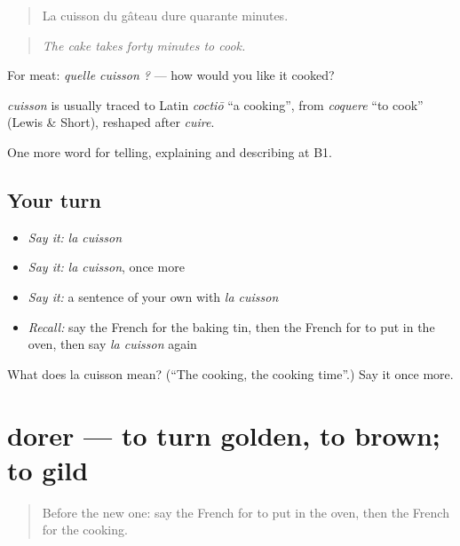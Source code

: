 \begin{quote}
La cuisson du gâteau dure quarante minutes.
\end{quote}

\begin{quote}
\emph{The cake takes forty minutes to cook.}
\end{quote}

For meat: \emph{quelle cuisson ?} — how would you like it cooked?

\begin{cousinweb}
\emph{cuisson} is usually traced to Latin \emph{coctiō} \textquotedblleft{}a cooking\textquotedblright{}, from \emph{coquere} \textquotedblleft{}to cook\textquotedblright{} (Lewis \& Short), reshaped after \emph{cuire}.
\end{cousinweb}

\begin{grammarlens}[title={What you've built}]
One more word for telling, explaining and describing at B1.
\end{grammarlens}

\subsection*{Your turn}
\begin{itemize}
\raggedright
  \item \emph{Say it:} \emph{la cuisson}
  \item \emph{Say it:} \emph{la cuisson}, once more
  \item \emph{Say it:} a sentence of your own with \emph{la cuisson}
  \item \emph{Recall:} say the French for the baking tin, then the French for to put in the oven, then say \emph{la cuisson} again
\end{itemize}

\begin{tcolorbox}[breakable,colback=teal!4,colframe=teal!35!black,title={Before you move on}]
What does la cuisson mean? (\textquotedblleft{}The cooking, the cooking time\textquotedblright{}.) Say it once more.
\end{tcolorbox}
\section[dorer]{dorer — to turn golden, to brown; to gild}

\label{lesson:FR-C331-dorer}



\begin{quote}
Before the new one: say the French for to put in the oven, then the French for the cooking.
\end{quote}

